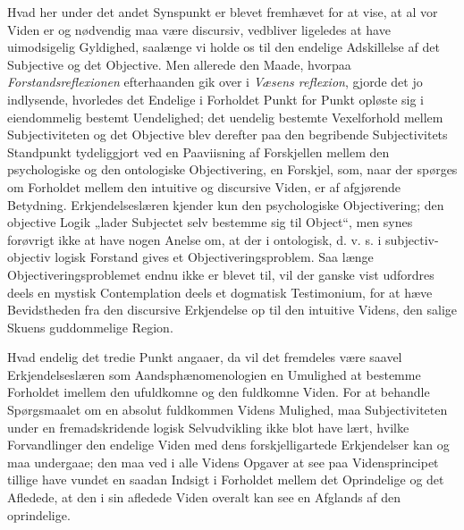 \documentclass[11pt]{book}
\newcommand{\opage}[1]{\marginnote{\footnotesize\textit{[#1]}}}
\begin{document}
Hvad her under det andet Synspunkt er blevet fremhævet for at vise, at
al vor Viden er og nødvendig maa være discursiv, vedbliver ligeledes at
have uimodsigelig Gyldighed, saalænge vi holde os til den endelige
Adskillelse af det Subjective og det Objective. Men allerede den Maade,
hvorpaa \emph{Forstandsreflexionen} efterhaanden gik over i
\emph{Væsens\-%
reflexion}, gjorde det jo indlysende, hvorledes det Endelige i
Forholdet Punkt for Punkt opløste sig i eiendommelig bestemt
Uendelighed; det uendelig bestemte Vexelforhold mellem Subjectiviteten
og det Objective blev derefter paa den begribende Subjectivitets
Standpunkt tydeliggjort ved en Paaviisning af Forskjellen mellem den
psychologiske og den ontologiske Objectivering, en Forskjel, som, naar
der spørges om Forholdet mellem den intuitive og discursive Viden, er
af afgjørende Betydning. Erkjendelseslæren kjender kun den
psychologiske Objectivering; den objective Logik „lader Subjectet selv
bestemme sig til Object“, men synes forøvrigt ikke at have nogen Anelse
om, at der i ontologisk, d. v. s. i subjectiv-objectiv logisk Forstand
gives et Objectiveringsproblem. Saa\-%
\opage{251} \setcounter{footnote}{0}%
længe Objectiveringsproblemet endnu ikke er blevet til, vil der ganske
vist udfordres deels en mystisk Contemplation deels et dogmatisk
Testimonium, for at hæve Bevidstheden fra den discursive Erkjendelse op
til den intuitive Videns, den salige Skuens guddommelige Region.

Hvad endelig det tredie Punkt angaaer, da vil det fremdeles være saavel
Erkjendelseslæren som Aandsphænomenologien en Umulighed at bestemme
Forholdet imellem den ufuldkomne og den fuldkomne Viden. For at
behandle Spørgsmaalet om en absolut fuldkommen Videns Mulighed, maa
Subjectiviteten under en fremadskridende logisk Selvudvikling ikke blot
have lært, hvilke Forvandlinger den endelige Viden med dens
forskjelligartede Erkjendelser kan og maa undergaae; den maa ved i alle
Videns Opgaver at see paa Vidensprincipet tillige have vundet en saadan
Indsigt i Forholdet mellem det Oprindelige og det Afledede, at den i
sin afledede Viden overalt kan see en Afglands af den oprindelige.
\end{document}
